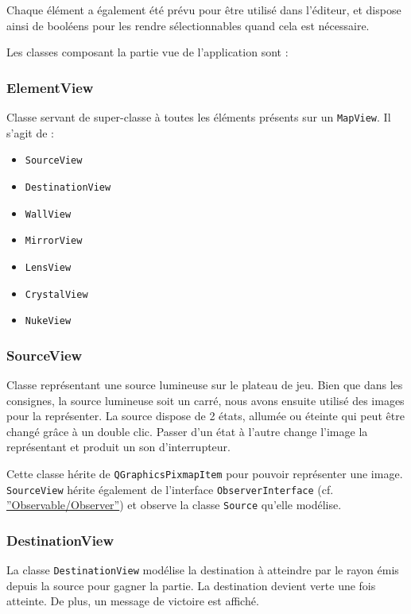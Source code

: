 \documentclass[]{article}
\begin{document}
Chaque élément a également été prévu pour être utilisé dans l’éditeur, et dispose ainsi de booléens pour les rendre 
sélectionnables quand cela est nécessaire.

Les classes composant la partie vue de l’application sont :

\subsubsection{ElementView}

Classe servant de super-classe à toutes les éléments présents sur un \texttt{MapView}.
Il s'agit de :

\begin{itemize}
    \item \texttt{SourceView}
    \item \texttt{DestinationView}
    \item \texttt{WallView}
    \item \texttt{MirrorView}
    \item \texttt{LensView}
    \item \texttt{CrystalView}
    \item \texttt{NukeView}
\end{itemize}

\subsubsection{\label{SourceView}SourceView}

Classe représentant une source lumineuse sur le plateau de jeu. Bien que dans les consignes, la source lumineuse soit un carré, nous avons ensuite utilisé des images pour la représenter.
La source dispose de 2 états, allumée ou éteinte qui peut être changé grâce à un double clic.
Passer d’un état à l’autre change l’image la représentant et produit un son d’interrupteur.

Cette classe hérite de \texttt{QGraphicsPixmapItem} pour pouvoir représenter une image.
\texttt{SourceView} hérite également de l'interface \texttt{ObserverInterface} (cf. \hyperref[OO]{''Observable/Observer''}) et observe
la classe \texttt{Source} qu'elle modélise.

\subsubsection{\label{DestinationView}DestinationView}

La classe \texttt{DestinationView} modélise la destination à atteindre par le rayon émis depuis la source pour gagner la partie.
La destination devient verte une fois atteinte. De plus, un message de victoire est affiché.
\end{document}
